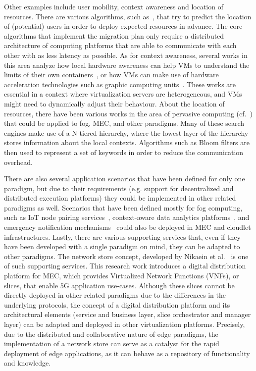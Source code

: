 \documentclass[twocolumn,preprint,3p]{elsarticle}
\begin{document}
Other examples include user mobility, context awareness and location of resources. There are various algorithms, such as~\cite{Hong2013,Ottenwalder2014}, that try to predict the location of (potential) users in order to deploy expected resources in advance. The core algorithms that implement the migration plan only require a distributed architecture of computing platforms that are able to communicate with each other with as less latency as possible. As for context awareness, several works in this area analyze how local hardware awareness can help VMs to understand the limits of their own containers~\cite{Zhanikeev15}, or how VMs can make use of hardware acceleration technologies such as graphic computing units~\cite{Paglierani15}. These works are essential in a context where virtualization servers are heterogeneous, and VMs might need to dynamically adjust their behaviour. About the location of resources, there have been various works in the area of pervasive computing (cf.~\cite{Romer10}) that could be applied to fog, MEC, and other paradigms. Many of these search engines make use of a N-tiered hierarchy, where the lowest layer of the hierarchy stores information about the local contexts. Algorithms such as Bloom filters are then used to represent a set of keywords in order to reduce the communication overhead.

There are also several application scenarios that have been defined for only one paradigm, but due to their requirements (e.g. support for decentralized and distributed execution platforms) they could be implemented in other related paradigms as well. Scenarios that have been defined mostly for fog computing, such as IoT node pairing services~\cite{Abedin15}, context-aware data analytics platforms~\cite{Manolopoulos14}, and emergency notification mechanisms~\cite{Aazam15} could also be deployed in MEC and cloudlet infrastructures. Lastly, there are various supporting services that, even if they have been developed with a single paradigm on mind, they can be adapted to other paradigms. The network store concept, developed by Nikaein et al.~\cite{Nikaein15} is one of such supporting services. This research work introduces a digital distribution platform for MEC, which provides Virtualized Network Functions (VNFs), or slices, that enable 5G application use-cases. Although these slices cannot be directly deployed in other related paradigms due to the differences in the underlying protocols, the concept of a digital distribution platform and its architectural elements (service and business layer, slice orchestrator and manager layer) can be adapted and deployed in other virtualization platforms. Precisely, due to the distributed and collaborative nature of edge paradigms, the implementation of a network store can serve as a catalyst for the rapid deployment of edge applications, as it can behave as a repository of functionality and knowledge.
\end{document}
